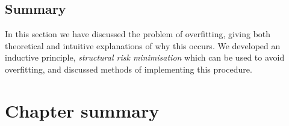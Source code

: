 \subsection{Summary}

In this section we have discussed the problem of overfitting, giving
both theoretical and intuitive explanations of why this occurs.  We
developed an inductive principle, \emph{structural risk minimisation}
which can be used to avoid overfitting, and discussed methods of
implementing this procedure.

\section{Chapter summary}










